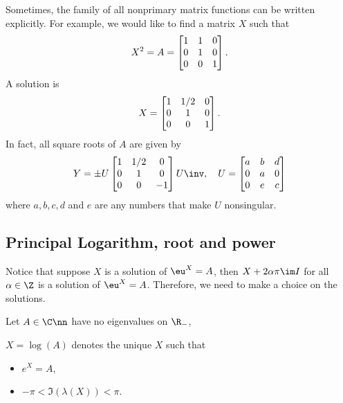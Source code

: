 \documentclass{article}
\begin{document}
Sometimes, the family of all nonprimary matrix functions can be written
explicitly. For example, we would like to find a matrix $X$ such that 
\begin{equation}\notag
    X^2 = A = 
    \begin{bmatrix}
        1 & 1 & 0 \\ 0 & 1 & 0 \\ 0 & 0 & 1
    \end{bmatrix}.
\end{equation}
A solution is 
\begin{equation}\notag
    X = 
    \begin{bmatrix}
        1 & 1/2 & 0 \\ 0 & 1 & 0 \\ 0 & 0 & 1
    \end{bmatrix}.
\end{equation}
In fact, all square roots of $A$ are given by 
\begin{equation}\notag
    Y = \pm U 
    \begin{bmatrix}
        1 & 1/2 & 0 \\ 0 & 1 & 0 \\ 0 & 0 & -1 
    \end{bmatrix}
    U\inv, \quad U =  
    \begin{bmatrix}
        a & b & d \\ 0 & a & 0 \\ 0 & e & c
    \end{bmatrix}
\end{equation}
where $a,b,c,d$ and $e$ are any numbers that make $U$ nonsingular.

\subsection{Principal Logarithm, root and power}
Notice that suppose $X$ is a solution of $\eu^X = A$, then $X + 2\alpha
\pi \im I$ for all $\alpha \in \Z$ is a solution of $\eu^X = A$.
Therefore, we need to make a choice on the solutions.

Let $A\in\C\nn$ have no eigenvalues on $\R_-$, 
\begin{definition}
     $X = \log(A)$ denotes the unique $X$ such that 
    \begin{itemize}
        \item $e^X = A$,
        \item $-\pi < \Im(\lambda(X)) < \pi$.
    \end{itemize}
\end{definition}
\end{document}
